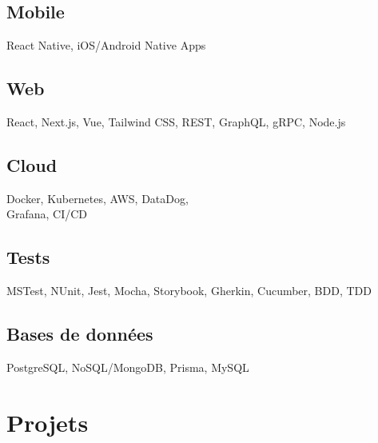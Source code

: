 \documentclass{article}
\begin{document}
\begin{paracol}{2}
\begin{leftcolumn}
    \subsection{Mobile}
    React Native, iOS/Android Native Apps

    \vspace{0.5em}

    \subsection{Web}
    React, Next.js, Vue, Tailwind CSS, REST, GraphQL, gRPC, Node.js

    \vspace{0.5em}

    \subsection{Cloud}
    Docker, Kubernetes, AWS, DataDog,\\
    Grafana, CI/CD

    \vspace{0.5em}

    \subsection{Tests}
    MSTest, NUnit, Jest, Mocha, Storybook, Gherkin, Cucumber, BDD, TDD

    \pagebreak

    \subsection{Bases de données}
    PostgreSQL, NoSQL/MongoDB, Prisma, MySQL

    \section{Projets}


\end{leftcolumn}
\end{paracol}
\end{document}
